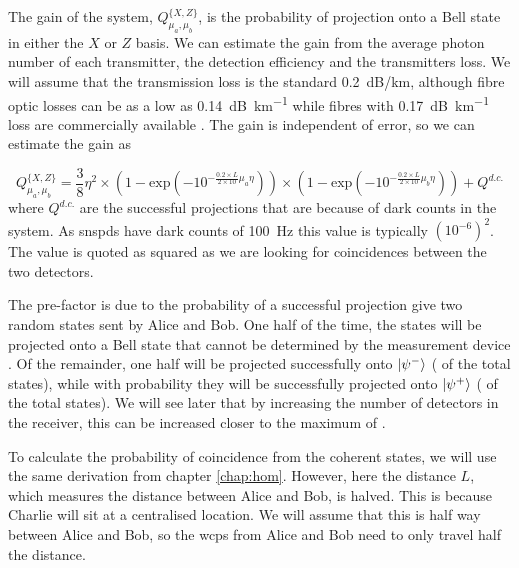 The gain of the system, $Q^{ \{X,Z\} }_{\mu_a,\mu_b}$, is the probability of projection onto a Bell state in either the $X$ or $Z$ basis. We can estimate the gain from the average photon number of each transmitter, the detection efficiency and the transmitters loss. We will assume that the transmission loss is the standard \SI{0.2}{dB/km}, although fibre optic losses can be as a low as \SI{0.14}{dB\per\km} \cite{tamura2018} while fibres with \SI{0.17}{dB\per\km} loss are commercially available \cite{corningULL}. The gain is independent of error, so we can estimate the gain as 

\begin{equation}
	Q^{ \{X,Z\} }_{\mu_a,\mu_b} = \frac{3}{8}  \eta^2 \times \left( 1 - \text{exp} \left( -10^{- \frac{0.2 \times L}{2 \times 10} \mu_a \eta}  \right)  \right) \times \left( 1 - \text{exp} \left( -10^{- \frac{0.2 \times L}{2 \times 10} \mu_b \eta}  \right)  \right) + Q^{d.c.}
\end{equation}
where $Q^{d.c.}$ are the successful projections that are because of dark counts in the system. As \acp{snspd} have dark counts of \SI{100}{Hz} this value is typically $\left(10^{-6}\right)^2$. The value is quoted as squared as we are looking for coincidences between the two detectors. 

The  pre-factor is due to the probability of a successful projection give two random states sent by Alice and Bob. One half of the time, the states will be projected onto a Bell state that cannot be determined by the measurement device \cite{walborn2003, Mattle1996}. Of the remainder, one half will be projected successfully onto $\ket{\psi^-}$ ( of the total states), while with probability  they will be successfully projected onto $\ket{\psi^+}$ ( of the total states). We will see later that by increasing the number of detectors in the receiver, this can be increased closer to the maximum of .

To calculate the probability of coincidence from the coherent states, we will use the same derivation from chapter \ref{chap:hom}. However, here the distance $L$, which measures the distance between Alice and Bob, is halved. This is because Charlie will sit at a centralised location. We will assume that this is half way between Alice and Bob, so the \acp{wcp} from Alice and Bob need to only travel half the distance. 


